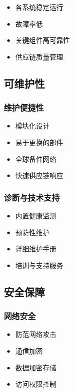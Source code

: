 \begin{multicols}{2}
  \begin{itemize}
      \item 各系统稳定运行
      \item 故障率低
      \item 关键组件高可靠性
      \item 供应链质量管理
  \end{itemize}
  
  \subsection{可维护性}
  
  \subsubsection{维护便捷性}
  
  \begin{itemize}
      \item 模块化设计
      \item 易于更换的部件
      \item 全球备件网络
      \item 快速供应链响应
  \end{itemize}
  
  \subsubsection{诊断与技术支持}
  
  \begin{itemize}
      \item 内置健康监测
      \item 预防性维护
      \item 详细维护手册
      \item 培训与支持服务
  \end{itemize}
  
  \subsection{安全保障}
  
  \subsubsection{网络安全}
  
  \begin{itemize}
      \item 防范网络攻击
      \item 通信加密
      \item 数据加密存储
      \item 访问权限控制
  \end{itemize}
  

\end{multicols}
